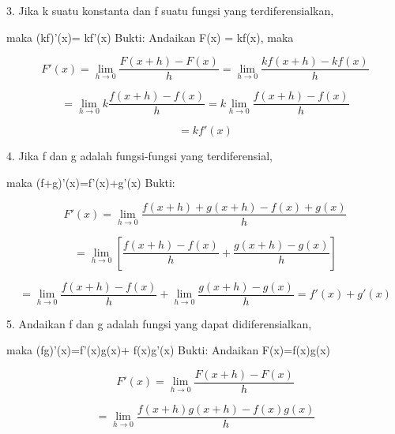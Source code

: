 \documentclass[a4paper,10pt]{article}
\begin{document}
\begin{eulernotebook}
\begin{eulercomment}
\begin{eulercomment}
\begin{eulercomment}
3. Jika k suatu konstanta dan f suatu fungsi yang terdiferensialkan,\\
\end{eulercomment}
\begin{eulerttcomment}
   maka (kf)'(x)= kf'(x)
   Bukti:
   Andaikan F(x) = kf(x), maka
\end{eulerttcomment}
\begin{eulerformula}
\[
F'(x)=\lim_{h\to 0}\frac{F(x+h)-F(x)}{h}=\lim_{h\to 0}\frac{kf(x+h)-kf(x)}{h}
\]
\end{eulerformula}
\begin{eulerformula}
\[
    =\lim_{h\to 0}k \frac{f(x+h)-f(x)}{h}=k\lim_{h\to 0}\frac{f(x+h)-f(x)}{h}
\]
\end{eulerformula}
\begin{eulerformula}
\[
=kf'(x)
\]
\end{eulerformula}
\begin{eulercomment}
4. Jika f dan g adalah fungsi-fungsi yang terdiferensial,\\
\end{eulercomment}
\begin{eulerttcomment}
   maka (f+g)'(x)=f'(x)+g'(x)
   Bukti:
\end{eulerttcomment}
\begin{eulerformula}
\[
F'(x)=\lim_{h\to 0}\frac{f(x+h)+g(x+h)-f(x)+g(x)}{h}
\]
\end{eulerformula}
\begin{eulerformula}
\[
=\lim_{h\to 0}[\frac{f(x+h)-f(x)}{h}+\frac{g(x+h)-g(x)}{h}]
\]
\end{eulerformula}
\begin{eulerformula}
\[
=\lim_{h\to 0}\frac{f(x+h)-f(x)}{h}+\lim_{h\to 0}\frac{g(x+h)-g(x)}{h}=f'(x)+g'(x)
\]
\end{eulerformula}
\begin{eulercomment}
5. Andaikan f dan g adalah fungsi yang dapat didiferensialkan,\\
\end{eulercomment}
\begin{eulerttcomment}
   maka (fg)'(x)=f'(x)g(x)+ f(x)g'(x)
   Bukti:
   Andaikan F(x)=f(x)g(x)
\end{eulerttcomment}
\begin{eulerformula}
\[
F'(x)= \lim_{h\to 0}\frac{F(x+h)-F(x)}{h}
\]
\end{eulerformula}
\begin{eulerformula}
\[
= \lim_{h\to 0}\frac{f(x+h)g(x+h)-f(x)g(x)}{h}
\]
\end{eulerformula}
\end{eulercomment}
\end{eulercomment}
\end{eulernotebook}
\end{document}
